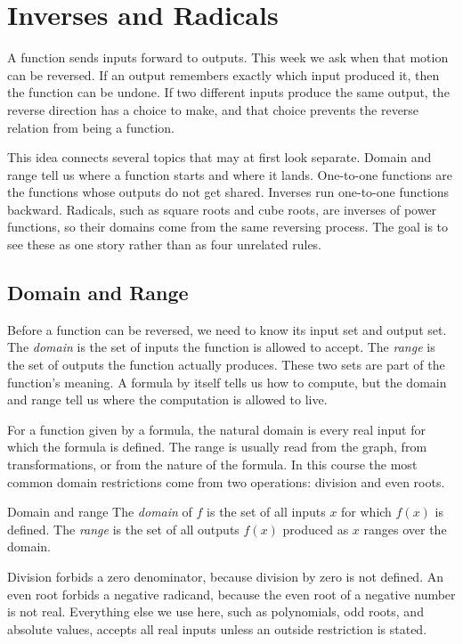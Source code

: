 \documentclass[12pt]{book}
\begin{document}
\chapter{Inverses and Radicals}

A function sends inputs forward to outputs. This week we ask when that motion can be
reversed. If an output remembers exactly which input produced it, then the function can
be undone. If two different inputs produce the same output, the reverse direction has a
choice to make, and that choice prevents the reverse relation from being a function.

This idea connects several topics that may at first look separate. Domain and range tell
us where a function starts and where it lands. One-to-one functions are the functions
whose outputs do not get shared. Inverses run one-to-one functions backward. Radicals,
such as square roots and cube roots, are inverses of power functions, so their domains
come from the same reversing process. The goal is to see these as one story rather than
as four unrelated rules.

\section{Domain and Range}

Before a function can be reversed, we need to know its input set and output set. The
\emph{domain} is the set of inputs the function is allowed to accept. The \emph{range}
is the set of outputs the function actually produces. These two sets are part of the
function's meaning. A formula by itself tells us how to compute, but the domain and
range tell us where the computation is allowed to live.

For a function given by a formula, the natural domain is every real input for which the
formula is defined. The range is usually read from the graph, from transformations, or
from the nature of the formula. In this course the most common domain restrictions come
from two operations: division and even roots.

\begin{definition}{Domain and range}
The \emph{domain} of $f$ is the set of all inputs $x$ for which $f(x)$ is defined.
The \emph{range} is the set of all outputs $f(x)$ produced as $x$ ranges over the
domain.
\end{definition}

Division forbids a zero denominator, because division by zero is not defined. An even
root forbids a negative radicand, because the even root of a negative number is not real.
Everything else we use here, such as polynomials, odd roots, and absolute values, accepts
all real inputs unless an outside restriction is stated.
\end{document}
